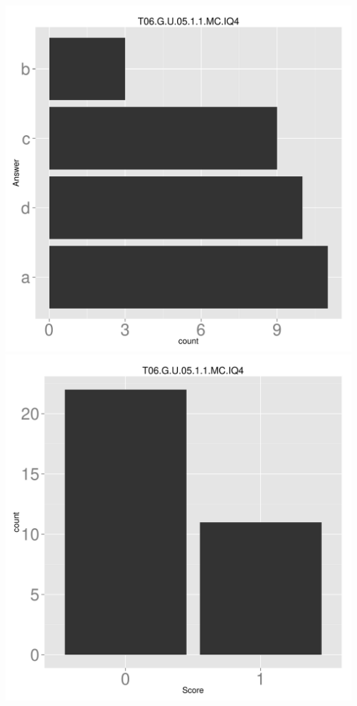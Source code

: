 \documentclass[12pt,nohyper]{tufte-handout}\usepackage[]{graphicx}\usepackage[]{color}
\begin{document}
\begin{center} \includegraphics[width=.45\linewidth]{Topic06_87_answer} \includegraphics[width=.45\linewidth]{Topic06_87_score} \end{center} 
\end{document}
